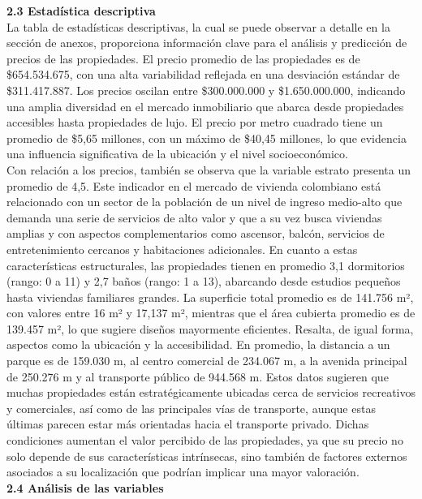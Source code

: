 \documentclass[a4paper]{article}
\theoremstyle{remark}
\theoremstyle{definition}
\begin{document}
\textbf{2.3 Estadística descriptiva}\\

La tabla de estadísticas descriptivas, la cual se puede observar a detalle en la sección de anexos, proporciona información clave para el análisis y predicción de precios de las propiedades. El precio promedio de las propiedades es de \$654.534.675, con una alta variabilidad reflejada en una desviación estándar de \$311.417.887. Los precios oscilan entre \$300.000.000 y \$1.650.000.000, indicando una amplia diversidad en el mercado inmobiliario que abarca desde propiedades accesibles hasta propiedades de lujo. El precio por metro cuadrado tiene un promedio de \$5,65 millones, con un máximo de \$40,45 millones, lo que evidencia una influencia significativa de la ubicación y el nivel socioeconómico.\\

Con relación a los precios, también se observa que la variable estrato presenta un promedio de 4,5. Este indicador en el mercado de vivienda colombiano está relacionado con un sector de la población de un nivel de ingreso medio-alto que demanda una serie de servicios de alto valor y que a su vez busca viviendas amplias y con aspectos complementarios como ascensor, balcón, servicios de entretenimiento cercanos y habitaciones adicionales. En cuanto a estas características estructurales, las propiedades tienen en promedio 3,1 dormitorios (rango: 0 a 11) y 2,7 baños (rango: 1 a 13), abarcando desde estudios pequeños hasta viviendas familiares grandes. La superficie total promedio es de 141.756 m², con valores entre 16 m² y 17,137 m², mientras que el área cubierta promedio es de 139.457 m², lo que sugiere diseños mayormente eficientes. Resalta, de igual forma, aspectos como la ubicación y la accesibilidad. En promedio, la distancia a un parque es de 159.030 m, al centro comercial de 234.067 m, a la avenida principal de 250.276 m y al transporte público de 944.568 m. Estos datos sugieren que muchas propiedades están estratégicamente ubicadas cerca de servicios recreativos y comerciales, así como de las principales vías de transporte, aunque estas últimas parecen estar más orientadas hacia el transporte privado. Dichas condiciones aumentan el valor percibido de las propiedades, ya que su precio no solo depende de sus características intrínsecas, sino también de factores externos asociados a su localización que podrían implicar una mayor valoración.\\

\textbf{2.4 Análisis de las variables}\\
\end{document}
